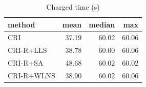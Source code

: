 \begin{table}[htbp]
\centering
\small
\caption{Charged time (s)}
\label{tab:E5b_ablation_60s_b60_time}
\begin{tabular}{lrrr}
\toprule
method & mean & median & max \\
\midrule
CRI & 37.19 & 60.02 & 60.06 \\
CRI-R+LLS & 38.78 & 60.00 & 60.06 \\
CRI-R+SA & 48.68 & 60.02 & 60.02 \\
CRI-R+WLNS & 38.90 & 60.02 & 60.06 \\
\bottomrule
\end{tabular}
\end{table}
